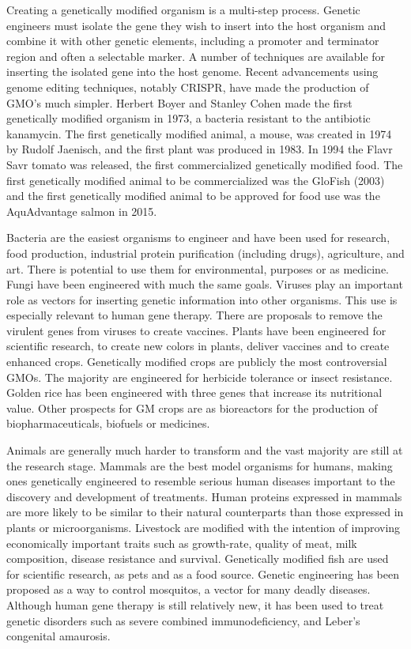 Creating a genetically modified organism is a multi-step process. Genetic engineers must isolate the gene they wish to insert into the host organism and combine it with other genetic elements, including a promoter and terminator region and often a selectable marker. A number of techniques are available for inserting the isolated gene into the host genome. Recent advancements using genome editing techniques, notably CRISPR, have made the production of GMO's much simpler. Herbert Boyer and Stanley Cohen made the first genetically modified organism in 1973, a bacteria resistant to the antibiotic kanamycin. The first genetically modified animal, a mouse, was created in 1974 by Rudolf Jaenisch, and the first plant was produced in 1983. In 1994 the Flavr Savr tomato was released, the first commercialized genetically modified food. The first genetically modified animal to be commercialized was the GloFish (2003) and the first genetically modified animal to be approved for food use was the AquAdvantage salmon in 2015.

Bacteria are the easiest organisms to engineer and have been used for research, food production, industrial protein purification (including drugs), agriculture, and art. There is potential to use them for environmental, purposes or as medicine. Fungi have been engineered with much the same goals. Viruses play an important role as vectors for inserting genetic information into other organisms. This use is especially relevant to human gene therapy. There are proposals to remove the virulent genes from viruses to create vaccines. Plants have been engineered for scientific research, to create new colors in plants, deliver vaccines and to create enhanced crops. Genetically modified crops are publicly the most controversial GMOs. The majority are engineered for herbicide tolerance or insect resistance. Golden rice has been engineered with three genes that increase its nutritional value. Other prospects for GM crops are as bioreactors for the production of biopharmaceuticals, biofuels or medicines.

Animals are generally much harder to transform and the vast majority are still at the research stage. Mammals are the best model organisms for humans, making ones genetically engineered to resemble serious human diseases important to the discovery and development of treatments. Human proteins expressed in mammals are more likely to be similar to their natural counterparts than those expressed in plants or microorganisms. Livestock are modified with the intention of improving economically important traits such as growth-rate, quality of meat, milk composition, disease resistance and survival. Genetically modified fish are used for scientific research, as pets and as a food source. Genetic engineering has been proposed as a way to control mosquitos, a vector for many deadly diseases. Although human gene therapy is still relatively new, it has been used to treat genetic disorders such as severe combined immunodeficiency, and Leber's congenital amaurosis.

